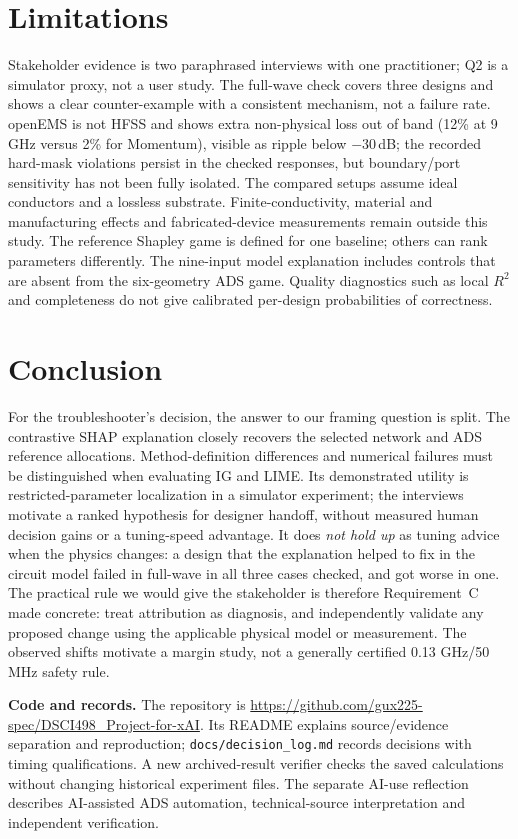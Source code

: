 \documentclass[conference,10pt]{IEEEtran}
\begin{document}
\section{Limitations}
Stakeholder evidence is two paraphrased interviews with one practitioner; Q2 is a simulator proxy, not a user study.
The full-wave check covers three designs and shows a clear counter-example with a consistent mechanism, not a failure rate.
openEMS is not HFSS and shows extra non-physical loss out of band (12\% at 9\,GHz versus 2\% for Momentum), visible as ripple below $-30$\,dB; the recorded hard-mask violations persist in the checked responses, but boundary/port sensitivity has not been fully isolated.
The compared setups assume ideal conductors and a lossless substrate. Finite-conductivity, material and manufacturing effects and fabricated-device measurements remain outside this study.
The reference Shapley game is defined for one baseline; others can rank parameters differently. The nine-input model explanation includes controls that are absent from the six-geometry ADS game. Quality diagnostics such as local $R^2$ and completeness do not give calibrated per-design probabilities of correctness.

\section{Conclusion}
For the troubleshooter's decision, the answer to our framing question is split.
The contrastive SHAP explanation closely recovers the selected network and ADS reference allocations. Method-definition differences and numerical failures must be distinguished when evaluating IG and LIME.
Its demonstrated utility is restricted-parameter localization in a simulator experiment; the interviews motivate a ranked hypothesis for designer handoff, without measured human decision gains or a tuning-speed advantage.
It does \emph{not hold up} as tuning advice when the physics changes: a design that the explanation helped to fix in the circuit model failed in full-wave in all three cases checked, and got worse in one.
The practical rule we would give the stakeholder is therefore Requirement~C made concrete: treat attribution as diagnosis, and independently validate any proposed change using the applicable physical model or measurement. The observed shifts motivate a margin study, not a generally certified 0.13 GHz/50 MHz safety rule.

\textbf{Code and records.} The repository is \url{https://github.com/gux225-spec/DSCI498_Project-for-xAI}. Its README explains source/evidence separation and reproduction; \texttt{docs/decision\_log.md} records decisions with timing qualifications. A new archived-result verifier checks the saved calculations without changing historical experiment files. The separate AI-use reflection describes AI-assisted ADS automation, technical-source interpretation and independent verification.



\end{document}
